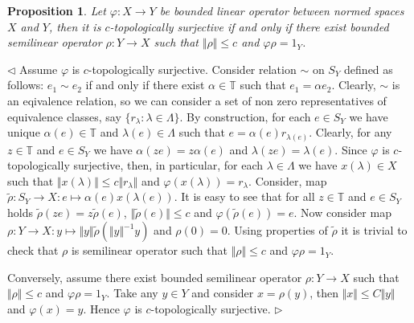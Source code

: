 \documentclass[12pt]{article}
\newtheorem{proposition}[theorem]{Proposition}
\newenvironment{proof}{\par $\triangleleft$}{$\triangleright$}
\begin{document}
\begin{proposition}\label{PrCTopSurIsRetrInNor0} Let $\varphi:X\to Y$ be bounded linear operator between normed spaces $X$ and $Y$, then it is $c$-topologically surjective if and only if there exist bounded semilinear operator $\rho:Y\to X$ such that $\Vert\rho\Vert\leq c$ and $\varphi\rho=1_Y$.
\end{proposition}
\begin{proof} Assume $\varphi$ is $c$-topologically surjective. Consider relation $\sim$ on $S_Y$ defined as follows: $e_1\sim e_2$  if and only if  there exist $\alpha\in\mathbb{T}$ such that $e_1=\alpha e_2$. Clearly, $\sim$ is an eqivalence relation, so we can consider a set of non zero representatives of equivalence classes, say $\{r_\lambda:\lambda\in\Lambda\}$. By construction, for each $e\in S_Y$ we have unique $\alpha(e)\in\mathbb{T}$ and $\lambda(e)\in\Lambda$ such that $e=\alpha(e)r_{\lambda(e)}$. Clearly, for any $z\in\mathbb{T}$ and $e\in S_Y$ we have $\alpha(ze)=z\alpha(e)$ and $\lambda(ze)=\lambda(e)$. Since $\varphi$ is $c$-topologically surjective, then, in particular, for each $\lambda\in\Lambda$ we have $x(\lambda)\in X$ such that $\Vert x(\lambda)\Vert\leq c\Vert r_\lambda\Vert$ and $\varphi(x(\lambda))=r_\lambda$. Consider, map $\tilde{\rho}:S_Y\to X:e\mapsto \alpha(e)x(\lambda(e))$. It is easy to see that for all $z\in\mathbb{T}$ and $e\in S_Y$ holds $\tilde{\rho}(z e)=z\tilde{\rho}(e)$, $\Vert\tilde{\rho}(e)\Vert\leq c$ and $\varphi(\tilde{\rho}(e))=e$. Now consider map $\rho:Y\to X: y\mapsto \Vert y\Vert\tilde{\rho}(\Vert y\Vert^{-1} y)$ and $\rho(0)=0$. Using properties of $\tilde{\rho}$ it is trivial to check that $\rho$ is semilinear operator such that $\Vert\rho\Vert\leq c$ and $\varphi\rho=1_Y$.

Conversely, assume there exist bounded semilinear operator $\rho:Y\to X$ such that $\Vert\rho\Vert\leq c$ and $\varphi\rho=1_Y$. Take any $y\in Y$ and consider $x=\rho(y)$, then $\Vert x\Vert\leq C\Vert y\Vert$ and $\varphi(x)=y$. Hence $\varphi$ is $c$-topologically surjective.
\end{proof}
\end{document}
